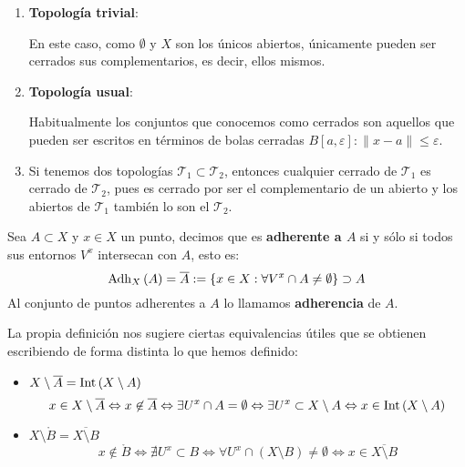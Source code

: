 \begin{ej}
\begin{enumerate}
    \item \textbf{Topología trivial}:
    
    En este caso, como $\emptyset$ y $X$ son los únicos abiertos, únicamente pueden ser cerrados sus complementarios, es decir, ellos mismos.
    
    \item \textbf{Topología usual}:
    
	Habitualmente los conjuntos que conocemos como cerrados son aquellos que pueden ser escritos en términos de bolas cerradas $B\left[ a, \varepsilon \right] : \lVert x - a \rVert \le \varepsilon$.
	
    \item Si tenemos dos topologías $\mathcal{T}_1 \subset \mathcal{T}_2$, entonces cualquier cerrado de $\mathcal{T}_1$ es cerrado de $\mathcal{T}_2$, pues es cerrado por ser el complementario de un abierto y los abiertos de $\mathcal{T}_1$ también lo son el $\mathcal{T}_2$.
\end{enumerate}
\end{ej}

\begin{defi}[Adherencia]
Sea $A \subset X$ y $x\in X$ un punto, decimos que es \textbf{adherente a $A$} si y sólo si todos sus entornos $V^x$ intersecan con $A$, esto es:
$$
\operatorname{Adh}_X\left( A \right) = \overline{A} := \{x \in X: \forall V^x \cap A \neq \emptyset\} \supset A
$$
Al conjunto de puntos adherentes a $A$ lo llamamos \textbf{adherencia} de $A$.
\end{defi}

\begin{obs}
La propia definición nos sugiere ciertas equivalencias útiles que se obtienen escribiendo de forma distinta lo que hemos definido:
\begin{itemize}
\item $X \setminus \overline{A} = \operatorname{Int}\left( X \setminus A \right)$
$$
x \in X \setminus \overline{A} \Leftrightarrow x \not\in \overline{A} \Leftrightarrow \exists U^x \cap A = \emptyset \Leftrightarrow \exists U^x \subset X \setminus A \Leftrightarrow x \in \operatorname{Int}\left( X \setminus A \right)
$$
\item $X \setminus \mathring{B} = \overline{X \setminus B}$
$$
x \not\in \mathring{B} \Leftrightarrow \nexists U^x \subset B \Leftrightarrow \forall U^x \cap \left( X \setminus B \right) \neq \emptyset \Leftrightarrow x \in \overline{X \setminus B}
$$
\end{itemize}
\end{obs}

